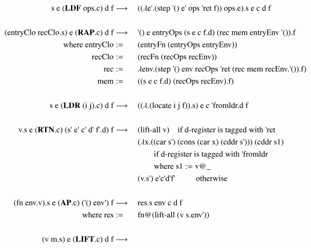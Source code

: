 \documentclass[a4paper,12pt,twoside,openright]{report}
\theoremstyle{definition}
\newcommand{\ts}{\textquotesingle}
\begin{document}
\begin{figure}[ht!]
\centering
\begin{alignat}{5}
		\text{s e (} \mathbf{LDF} \text{ ops.c) d f} & \longrightarrow \: && \text{(($\lambda$e{\ts}.(step {\ts}() e{\ts} ops {\ts}ret f)) ops.e).s e c d f} \label{eq:secd_sem_ldf} \\
		\nonumber \\%
		\text{(entryClo recClo.s) e (} \mathbf{RAP}\text{.c) d f} & \longrightarrow \: && \text{{\ts}() e entryOps (s e c f.d) (rec mem entryEnv {\ts}()).f} \label{eq:secd_sem_rap} \\
		\text{where entryClo} & := && \text{(entryFn (entryOps entryEnv))} \nonumber \\
		\text{recClo} & := && \text{(recFn (recOps recEnv))} \nonumber \\
		\text{rec} & := && \text{$\lambda$env.(step {\ts}() env recOps {\ts}ret (rec mem recEnv.{\ts}()).f)} \nonumber \\
		\text{mem} & := && \text{((s e c f.d) (recOps recEnv).f)} \nonumber \\
		\nonumber \\%
		\text{s e (} \mathbf{LDR} \text{ (i j).c) d f} & \longrightarrow \: && \text{(($\lambda$.(locate i j f)).s) e c {\ts}fromldr.d f} \\
		\nonumber \\%
		\text{v.s e (} \mathbf{RTN}\text{.c) (s{\ts} e{\ts} c{\ts}  d{\ts}  f{\ts}.d) f} & \longrightarrow \:
		 && \text{(lift-all v)} 									\quad	\text{if d-register is tagged with {\ts}ret}	\\
		 & && \text{($\lambda$x.((car s{\ts}) (cons (car x) (cddr s{\ts}))) (cddr s1)	} \nonumber \\
		 & && \qquad\text{if d-register is tagged with {\ts}fromldr} \nonumber \\
		 & && \qquad\text{where s1} := \text{v@\_} \nonumber \\
 		 & && \text{(v.s\ts)  e\ts  c\ts  d\ts  f\ts}	\qquad\;\;\text{otherwise} \nonumber \\
 		\nonumber \\%
		\text{(fn env.v).s e (} \mathbf{AP}\text{.c) ({\ts}() env{\ts}) f} & \longrightarrow \: && \text{res.s env c d f} \\
		\text{where res} & := && \text{fn@(lift-all (v s.env{\ts}))\textbf{\textbf{}}} \nonumber \\
		\nonumber \\%
		\text{(v m.s) e (} \mathbf{LIFT}\text{.c) d f} & \longrightarrow \: \label{eq:secd_sem_lift}

\end{alignat}
\end{figure}
\end{document}
